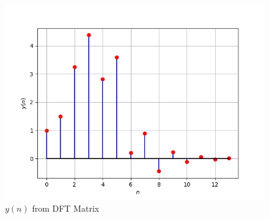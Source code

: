\documentclass[journal,12pt,twocolumn]{IEEEtran}
\theoremstyle{remark}
\begin{document}
\begin{figure}[!ht]
\centering
\includegraphics[width=\columnwidth]{figs/matrix.png}
\caption{$y(n)$ from DFT Matrix}
\label{fig:yn_DFT_matrix}
\end{figure}
\end{document}

